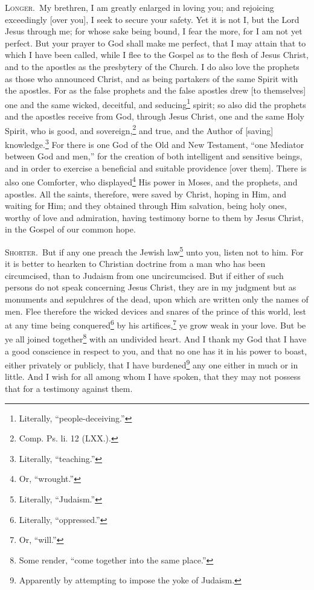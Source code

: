 \textsc{Longer.}~My brethren, I am greatly enlarged in loving you; and rejoicing exceedingly [over you], I seek to secure your safety. Yet it is not I, but the Lord Jesus through me; for whose sake being bound, I fear the more, for I am not yet perfect. But your prayer to God shall make me perfect, that I may attain that to which I have been called, while I flee to the Gospel as to the flesh of Jesus Christ, and to the apostles as the presbytery of the Church. I do also love the prophets as those who announced Christ, and as being partakers of the same Spirit with the apostles. For as the false prophets and the false apostles drew [to themselves] one and the same wicked, deceitful, and seducing\footnote{Literally, “people-deceiving.”} spirit; so also did the prophets and the apostles receive from God, through Jesus Christ, one and the same Holy Spirit, who is good, and sovereign,\footnote{Comp. Ps. li. 12 (LXX.).} and true, and the Author of [saving] knowledge.\footnote{Literally, “teaching.”} For there is one God of the Old and New Testament, “one Mediator between God and men,” for the creation of both intelligent and sensitive beings, and in order to exercise a beneficial and suitable providence [over them]. There is also one Comforter, who displayed\footnote{Or, “wrought.”} His power in Moses, and the prophets, and apostles. All the saints, therefore, were saved by Christ, hoping in Him, and waiting for Him; and they obtained through Him salvation, being holy ones, worthy of love and admiration, having testimony borne to them by Jesus Christ, in the Gospel of our common hope.


\textsc{Shorter.}~But if any one preach the Jewish law\footnote{Literally, “Judaism.”} unto you, listen not to him. For it is better to hearken to Christian doctrine from a man who has been circumcised, than to Judaism from one uncircumcised. But if either of such persons do not speak concerning Jesus Christ, they are in my judgment but as monuments and sepulchres of the dead, upon which are written only the names of men. Flee therefore the wicked devices and snares of the prince  of this world, lest at any time being conquered\footnote{Literally, “oppressed.”} by his artifices,\footnote{Or, “will.”} ye grow weak in your love. But be ye all joined together\footnote{Some render, “come together into the same place.”} with an undivided heart. And I thank my God that I have a good conscience in respect to you, and that no one has it in his power to boast, either privately or publicly, that I have burdened\footnote{Apparently by attempting to impose the yoke of Judaism.} any one either in much or in little. And I wish for all among whom I have spoken, that they may not possess that for a testimony against them.

